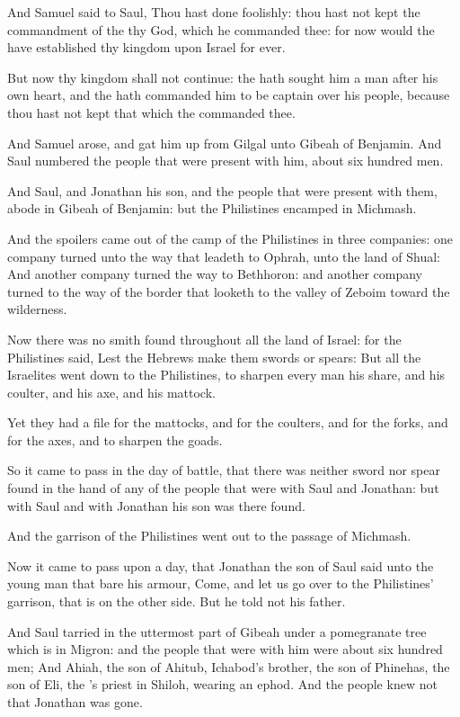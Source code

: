 \Verse And Samuel said to Saul, Thou hast done foolishly: thou hast not kept the commandment of the \LORD thy God, which he commanded thee: for now would the \LORD have established thy kingdom upon Israel for ever.

\Verse But now thy kingdom shall not continue: the \LORD hath sought him a man after his own heart, and the \LORD hath commanded him to be captain over his people, because thou hast not kept that which the \LORD commanded thee.

\Verse And Samuel arose, and gat him up from Gilgal unto Gibeah of Benjamin. And Saul numbered the people that were present with him, about six hundred men.

\Verse And Saul, and Jonathan his son, and the people that were present with them, abode in Gibeah of Benjamin: but the Philistines encamped in Michmash.

\Verse And the spoilers came out of the camp of the Philistines in three companies: one company turned unto the way that leadeth to Ophrah, unto the land of Shual: \Verse And another company turned the way to Bethhoron: and another company turned to the way of the border that looketh to the valley of Zeboim toward the wilderness.

\Verse Now there was no smith found throughout all the land of Israel: for the Philistines said, Lest the Hebrews make them swords or spears: \Verse But all the Israelites went down to the Philistines, to sharpen every man his share, and his coulter, and his axe, and his mattock.

\Verse Yet they had a file for the mattocks, and for the coulters, and for the forks, and for the axes, and to sharpen the goads.

\Verse So it came to pass in the day of battle, that there was neither sword nor spear found in the hand of any of the people that were with Saul and Jonathan: but with Saul and with Jonathan his son was there found.

\Verse And the garrison of the Philistines went out to the passage of Michmash.


\Chapter
\Verse Now it came to pass upon a day, that Jonathan the son of Saul said unto the young man that bare his armour, Come, and let us go over to the Philistines' garrison, that is on the other side. But he told not his father.

\Verse And Saul tarried in the uttermost part of Gibeah under a pomegranate tree which is in Migron: and the people that were with him were about six hundred men; \Verse And Ahiah, the son of Ahitub, Ichabod's brother, the son of Phinehas, the son of Eli, the \LORD's priest in Shiloh, wearing an ephod. And the people knew not that Jonathan was gone.

